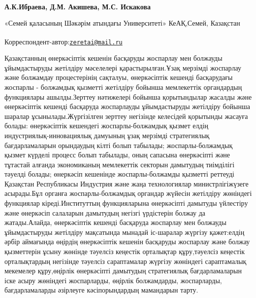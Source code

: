 
\begin{articleheader}

{\bfseries А.К.Ибраева\textsuperscript{\envelope }, Д.М. Акишева, М.С. Искакова}
\end{articleheader}
\begin{affiliation}

«Семей қаласының Шәкәрім атындағы Университеті» КеАҚ,Семей, Казақстан

\raggedright {\bfseries \textsuperscript{\envelope }}Корреспондент-автор:\href{mailto:zeretai@mail.ru}{\nolinkurl{zeretai@mail.ru}}
\end{affiliation}

Қазақстанның өнеркәсіптік кешенін басқаруды жоспарлау мен болжауды
ұйымдастыруды жетілдіру мәселелері қарастырылған.Ұзақ мерзімді жоспарлау
және болжамдау процестерінің сақталуы, өнеркәсіптік кешенді басқарудағы
жоспарлы - болжамдық қызметті жетілдіру бойынша мемлекеттік органдардың
функциялары ашылды.Зерттеу нәтижелері бойынша қорытындылар жасалды және
өнеркәсіптік кешенді басқаруда жоспарлауды ұйымдастыруды жетілдіру
бойынша шаралар ұсынылады.Жүргізілген зерттеу негізінде келесідей
қорытынды жасауға болады: өнеркәсіптік кешендегі жоспарлы-болжамдық
қызмет елдің индустриялық-инновациялық дамуының ұзақ мерзімді
стратегиялық бағдарламаларын орындаудың кілті болып табылады;
жоспарлы-болжамдық қызмет күрделі процесс болып табылады, оның сапасына
өнеркәсіпті және тұтастай алғанда экономиканың мемлекеттік секторын
дамытудың тиімділігі тәуелді болады; өнеркәсіп кешенінде
жоспарлы-болжамды қызметті реттеуді Қазақстан Республикасы Индустрия
және жаңа технологиялар министрлігіжүзеге асырады.Бұл органға
жоспарлы-болжамдық органдар жүйесін жетілдіру жөніндегі функциялар
кіреді.Институттың функцияларына өнеркәсіпті дамытуды үйлестіру және
өнеркәсіп салаларын дамытудың негізгі үрдістерін болжау да
жатады.Алайда, өнеркәсіптік кешенді басқаруда жоспарлау мен болжауды
ұйымдастыруды жетілдіру мақсатында мынадай іс-шаралар жүргізу
қажет:елдің әрбір аймағында өңірдің өнеркәсіптік кешенін басқаруды
жоспарлау және болжау қызметтерін ұсыну жөнінде тәуелсіз кеңестік
орталықтар құру,тәуелсіз кеңестік орталықтардың негізінде тәуелсіз
сараптамалар жүргізу жөніндегі сараптамалық мекемелер құру,өңірлік
өнеркәсіпті дамытудың стратегиялық бағдарламаларын іске асыру жөніндегі
жоспарларды, өңірлік болжамдарды, жоспарларды, бағдарламаларды әзірлеуге
кәсіпорындардың мамандарын тарту.

